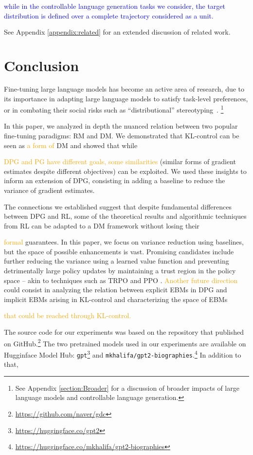 \textcolor{blue}{while in the controllable language generation tasks we consider, the target distribution is defined over a complete trajectory considered as a unit.}

See Appendix \ref{appendix:related} for an extended discussion of related work.

\section{Conclusion}\label{section:discussion}

Fine-tuning large language models has become an active area of research, due to its importance in adapting large language models to satisfy task-level preferences, or in combating their social risks such as “distributional” stereotyping~\citep{ethical_lm_deepmind, ethical_lm_deepmind2}.
\footnote{See Appendix \ref{section:Broader} for a discussion of broader impacts of large language models and controllable language generation.}

In this paper, we analyzed in depth the nuanced relation between two popular fine-tuning paradigms: RM and DM. We demonstrated that KL-control can be seen as \textcolor{orange}{a form of} DM and showed that while 

\textcolor{orange}{DPG and PG have different goals, some similarities} (similar forms of gradient estimates despite different objectives) can be exploited. We used these insights to inform an extension of DPG, consisting in adding a baseline to reduce the variance of gradient estimates.

The connections we established suggest that despite fundamental differences between DPG and RL, some of the theoretical results and algorithmic techniques from RL can be adapted to a DM framework without losing their 

\textcolor{orange}{formal}
guarantees. In this paper, we focus on variance reduction using baselines, but the space of possible enhancements is vast. Promising candidates include further reducing the variance using a learned value function \citep{conda_actor} and preventing detrimentally large policy updates by maintaining a trust region in the policy space -- akin to techniques such as TRPO \citep{schulman2015trust} and PPO \citep{schulman2017proximal}. \textcolor{orange}{Another future direction} could consist in analyzing the relation between explicit EBMs in DPG and implicit EBMs arising in KL-control and characterizing the space of EBMs 

\textcolor{orange}{that could be reached through KL-control.}

The source code for our experiments was based on the repository that \cite{khalifa_2021} published on GitHub.\footnote{\url{https://github.com/naver/gdc}} The two pretrained models used in our experiments are available on Hugginface Model Hub: \texttt{gpt}\footnote{\url{https://huggingface.co/gpt2}} and \texttt{mkhalifa/gpt2-biographies}.\footnote{\url{https://huggingface.co/mkhalifa/gpt2-biographies}} In addition to that, 


